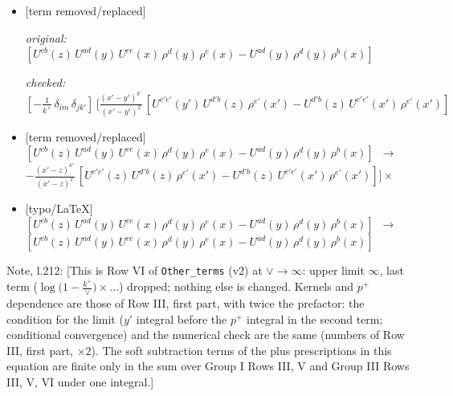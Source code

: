 \documentclass[10pt]{article}
\newenvironment{notebox}{\def\FrameCommand{{\color{notebar}\vrule width 1.5pt}\hspace{6pt}}\MakeFramed{\advance\hsize-\width\FrameRestore}\small}{\endMakeFramed}
\begin{document}
\begin{itemize}[leftmargin=2.2em,itemsep=1pt,topsep=2pt]
\item[\textbf{l.210}] \textsf{\small [term removed/replaced]} \par\noindent\emph{original:} $\displaystyle [U^{cb}(z)\,U^{ad}(y)\,U^{ce}(x)\,\rho^{d}(y)\,\rho^{e}(x)-U^{ad}(y)\,\rho^{d}(y)\,\rho^{b}(x)]$\par\noindent\emph{checked:} $\displaystyle [-\frac{1}{k^{+}}\, \delta_{im}\, \delta_{jk'}]\, \Bigg[\frac{(x'-y')^{k'}}{(x'-y')^{2}}\,[U^{c'e'}(y')\,U^{d'b}(z)\,\rho^{e'}(x')-U^{d'b}(z)\,U^{c'e'}(x')\,\rho^{e'}(x')]$
\item[\textbf{l.210}] \textsf{\small [term removed/replaced]} $\displaystyle [U^{cb}(z)\,U^{ad}(y)\,U^{ce}(x)\,\rho^{d}(y)\,\rho^{e}(x)-U^{ad}(y)\,\rho^{d}(y)\,\rho^{b}(x)]$\ $\longrightarrow$\ $\displaystyle -\frac{(x'-z)^{k'}}{(x'-z)^{2}}\,[U^{c'e'}(z)\,U^{d'b}(z)\,\rho^{e'}(x')-U^{d'b}(z)\,U^{c'e'}(x')\,\rho^{e'}(x')]\Bigg]\times$
\item[\textbf{l.210}] \textsf{\small [typo/LaTeX]} $\displaystyle [U^{cb}(z)\,U^{ad}(y)\,U^{ce}(x)\,\rho^{d}(y)\,\rho^{e}(x)-U^{ad}(y)\,\rho^{d}(y)\,\rho^{b}(x)]$\ $\longrightarrow$\ $\displaystyle [U^{cb}(z)\,U^{ad}(y)\,U^{ce}(x)\,\rho^{d}(y)\,\rho^{e}(x)-U^{ad}(y)\,\rho^{d}(y)\,\rho^{b}(x)]$
\end{itemize}
\begin{notebox}\textsf{\small Note, l.212:} [This is Row VI of \texttt{Other\_terms} (v2) at $\vee\to\infty$: upper limit $\infty$, last term ($\log\big(1-\frac{k^{+}}{\vee}\big)\times\dots$) dropped; nothing else is changed. Kernels and $p^{+}$ dependence are those of Row III, first part, with twice the prefactor: the condition for the limit ($y'$ integral before the $p^{+}$ integral in the second term; conditional convergence) and the numerical check are the same (numbers of Row III, first part, $\times2$). The soft subtraction terms of the plus prescriptions in this equation are finite only in the sum over Group I Rows III, V and Group III Rows III, V, VI under one integral.]\end{notebox}
\bigskip
\end{document}
